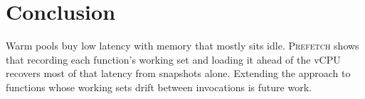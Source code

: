 \section{Conclusion}
\label{sec:conclusion}

Warm pools buy low latency with memory that mostly sits idle. \textsc{Prefetch}
shows that recording each function's working set and loading it ahead of the
vCPU recovers most of that latency from snapshots alone. Extending the approach
to functions whose working sets drift between invocations is future work.
